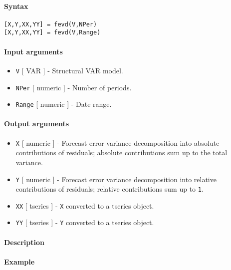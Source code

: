 


	\paragraph{Syntax}\label{syntax}

\begin{verbatim}
[X,Y,XX,YY] = fevd(V,NPer)
[X,Y,XX,YY] = fevd(V,Range)
\end{verbatim}

\paragraph{Input arguments}\label{input-arguments}

\begin{itemize}
\item
  \texttt{V} {[} VAR {]} - Structural VAR model.
\item
  \texttt{NPer} {[} numeric {]} - Number of periods.
\item
  \texttt{Range} {[} numeric {]} - Date range.
\end{itemize}

\paragraph{Output arguments}\label{output-arguments}

\begin{itemize}
\item
  \texttt{X} {[} numeric {]} - Forecast error variance decomposition
  into absolute contributions of residuals; absolute contributions sum
  up to the total variance.
\item
  \texttt{Y} {[} numeric {]} - Forecast error variance decomposition
  into relative contributions of residuals; relative contributions sum
  up to \texttt{1}.
\item
  \texttt{XX} {[} tseries {]} - \texttt{X} converted to a tseries
  object.
\item
  \texttt{YY} {[} tseries {]} - \texttt{Y} converted to a tseries
  object.
\end{itemize}

\paragraph{Description}\label{description}

\paragraph{Example}\label{example}


